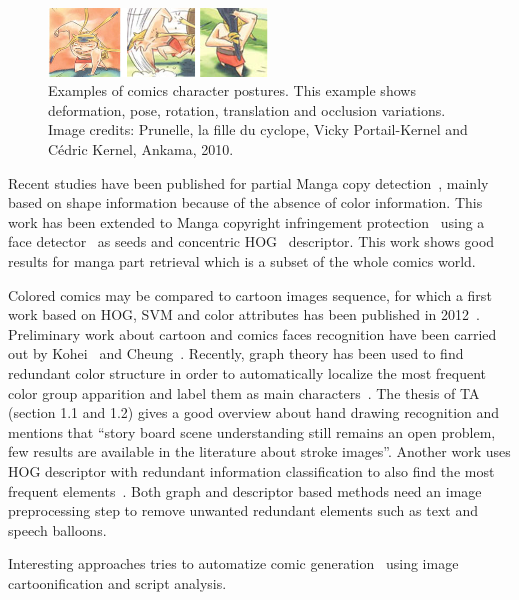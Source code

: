  \begin{figure}[!ht]	%
 	 \centering
 	\includegraphics[width=220px]{figs/prunelle.png}
 	\caption{Examples of comics character postures. This example shows deformation, pose, rotation, translation and occlusion variations. Image credits: Prunelle, la fille du cyclope, Vicky Portail-Kernel and C\'{e}dric Kernel, Ankama, 2010.
}
 	\label{fig:tarzan}
 \end{figure}

Recent studies have been published for partial Manga copy detection~\cite{Sun2010}, mainly based on shape information because of the absence of color information.
This work has been extended to Manga copyright infringement protection~\cite{Sun2013IJDAR} using a face detector~\cite{Viola2004robust} as seeds and concentric HOG~\cite{Dalal05} descriptor.
This work shows good results for manga part retrieval which is a subset of the whole comics world.

Colored comics may be compared to cartoon images sequence, for which a first work based on HOG, SVM and color attributes has been published in 2012~\cite{Khan12}.
Preliminary work about cartoon and comics faces recognition have been carried out by Kohei~\cite{Kohei2012} and Cheung~\cite{cheung2008face}.
Recently, graph theory has been used to find redundant color structure in order to automatically localize the most frequent color group apparition and label them as main characters~\cite{HoGREC2013}.
The thesis of TA~\cite{TAPhD2010} (section 1.1 and 1.2) gives a good overview about hand drawing recognition and mentions that ``story board scene understanding still remains an open problem, few results are available in the literature about stroke images''.
Another work uses HOG descriptor with redundant information classification to also find the most frequent elements~\cite{SunICDAR2013}.
Both graph and descriptor based methods need an image preprocessing step to remove unwanted redundant elements such as text and speech balloons.

Interesting approaches tries to automatize comic generation~\cite{Tobita2010Comic,WangHYYC12} using image cartoonification and script analysis.

